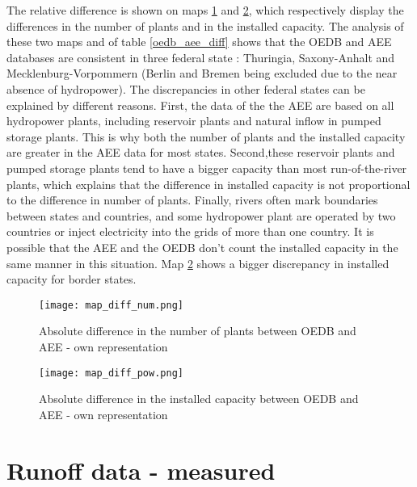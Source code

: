 The relative difference is shown on maps \ref{map_diff_num} and \ref{map_diff_pow}, which respectively display the differences in the number of plants and in the installed capacity. The analysis of these two maps and of table \ref{oedb_aee_diff} shows that the OEDB and AEE databases are consistent in three federal state : Thuringia, Saxony-Anhalt and Mecklenburg-Vorpommern (Berlin and Bremen being excluded due to the near absence of hydropower). The discrepancies in other federal states can be explained by different reasons. First, the data of the the AEE are based on all hydropower plants, including reservoir plants and natural inflow in pumped storage plants. This is why both the number of plants and the installed capacity are greater in the AEE data for most states. Second,these reservoir plants and pumped storage plants tend to have a bigger capacity than most run-of-the-river plants, which explains that the difference in installed capacity is not proportional to the difference in number of plants. Finally, rivers often mark boundaries between states and countries, and some hydropower plant are operated by two countries or inject electricity into the grids of more than one country. It is possible that the AEE and the OEDB don't count the installed capacity in the same manner in this situation. Map \ref{map_diff_pow} shows a bigger discrepancy in installed capacity for border states.


\begin{figure}[H]
\texttt{[image: map\_diff\_num.png]}
\caption[Absolute difference in the number of plants between OEDB and AEE]{Absolute difference in the number of plants between OEDB and AEE - own representation}
\centering
\label{map_diff_num}
\end{figure}


\begin{figure}[H]
\texttt{[image: map\_diff\_pow.png]}
\caption[Absolute difference in the installed capacity between OEDB and AEE]{Absolute difference in the installed capacity between OEDB and AEE - own representation}
\centering
\label{map_diff_pow}
\end{figure}

\section{Runoff data - measured}

